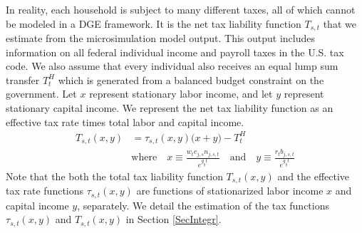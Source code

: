 \documentclass[letterpaper,12pt]{article}
\theoremstyle{definition}
\begin{document}
\begin{spacing}{1.5}
    In reality, each household is subject to many different taxes, all of which cannot be modeled in a DGE framework. It is the net tax liability function $T_{s,t}$ that we estimate from the microsimulation model output. This output includes information on all federal individual income and payroll taxes in the U.S. tax code. We also assume that every individual also receives an equal lump sum transfer $T^H_{t}$ which is generated from a balanced budget constraint on the government. Let $x$ represent stationary labor income, and let $y$ represent stationary capital income. We represent the net tax liability function as an effective tax rate times total labor and capital income.
    \begin{equation}\label{EqNetTaxLiab}
      \begin{split}
        T_{s,t}(x, y) &= \tau_{s,t}(x, y)\bigl(x + y\bigr) - T^H_t \\
        &\text{where}\quad x\equiv \frac{w_t e_{j,s}n_{j,s,t}}{e^{g_y t}} \quad\text{and}\quad y\equiv \frac{r_t b_{j,s,t}}{e^{g_y t}}
      \end{split}
    \end{equation}
    Note that the both the total tax liability function $T_{s,t}(x,y)$ and the effective tax rate functions $\tau_{s,t}(x,y)$ are functions of stationarized labor income $x$ and capital income $y$, separately. We detail the estimation of the tax functions $\tau_{s,t}(x,y)$ and $T_{s,t}(x,y)$ in Section \ref{SecIntegr}.


\end{spacing}
\end{document}
